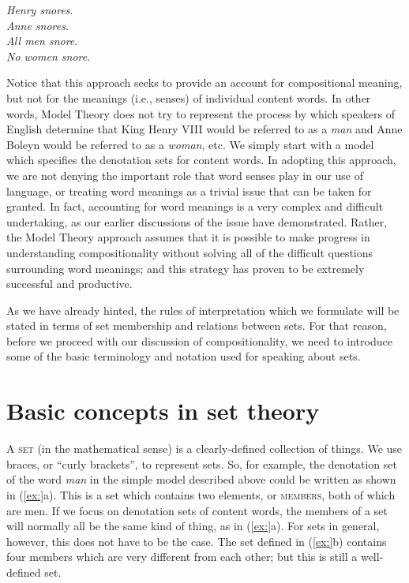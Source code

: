 \ea
\ea \textit{Henry snores}.\\
\ex \textit{Anne snores}.\\
\ex \textit{All men snore}.\\
\ex \textit{No women snore}.
                       \z
\z


Notice that this approach seeks to provide an account for compositional meaning, but not for the meanings (i.e., senses) of individual content words. In other words, Model Theory does not try to represent the process by which speakers of English determine that King Henry VIII would be referred to as a \textit{man} and Anne Boleyn would be referred to as a \textit{woman}, etc. We simply start with a model which specifies the denotation sets for content words. In adopting this approach, we are not denying the important role that word senses play in our use of language, or treating word meanings as a trivial issue that can be taken for granted. In fact, accounting for word meanings is a very complex and difficult undertaking, as our earlier discussions of the issue have demonstrated. Rather, the Model Theory approach assumes that it is possible to make progress in understanding compositionality without solving all of the difficult questions surrounding word meanings; and this strategy has proven to be extremely successful and productive.



As we have already hinted, the rules of interpretation which we formulate will be stated in terms of set membership and relations between sets. For that reason, before we proceed with our discussion of compositionality, we need to introduce some of the basic terminology and notation used for speaking about sets.


\section{Basic concepts in set theory}\label{sec:13.3}

A \textsc{set} (in the mathematical sense) is a clearly-defined collection of things. We use braces, or “curly brackets”, to represent sets. So, for example, the denotation set of the word \textit{man} in the simple model described above could be written as shown in (\ref{ex:}a). This is a set which contains two elements, or \textsc{members}, both of which are men. If we focus on denotation sets of content words, the members of a set will normally all be the same kind of thing, as in (\ref{ex:}a). For sets in general, however, this does not have to be the case. The set defined in (\ref{ex:}b) contains four members which are very different from each other; but this is still a well-defined set.



